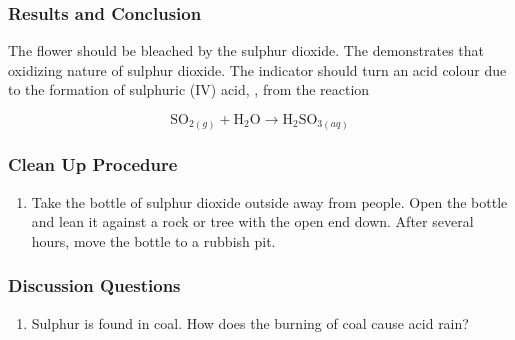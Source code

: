 \subsubsection{Results and Conclusion}
The flower should be bleached by the sulphur dioxide. The demonstrates that oxidizing nature of sulphur dioxide. The indicator should turn an acid colour due to the formation of sulphuric (IV) acid, , from the reaction

$$\mathrm{SO}_{2(g)} + \mathrm{H}_2\mathrm{O} \longrightarrow \mathrm{H}_2\mathrm{SO}_{3(aq)}$$

\subsubsection*{Clean Up Procedure}
\begin{enumerate}
\item{Take the bottle of sulphur dioxide outside away from people. Open the bottle and lean it against a rock or tree with the open end down. After several hours, move the bottle to a rubbish pit.}
\end{enumerate}

\subsubsection*{Discussion Questions}
\begin{enumerate}
\item{Sulphur is found in coal. How does the burning of coal cause acid rain?}
\end{enumerate}
